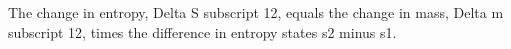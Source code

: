 The change in entropy, Delta S subscript 12, equals the change in mass, Delta m subscript 12, times the difference in entropy states s2 minus s1.